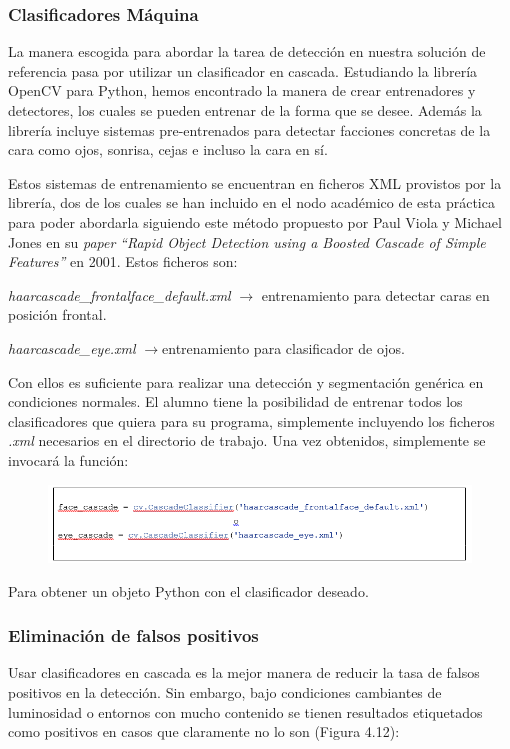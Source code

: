 \subsubsection{Clasificadores Máquina}
La manera escogida para abordar la tarea de detección en nuestra solución de referencia pasa por utilizar un clasificador en cascada. 
Estudiando la librería OpenCV para Python, hemos encontrado la manera de crear entrenadores y detectores, los cuales se pueden entrenar de la forma que se desee. Además la librería incluye sistemas pre-entrenados para detectar facciones concretas de la cara como ojos, sonrisa, cejas e incluso la cara en sí.

Estos sistemas de entrenamiento se encuentran en ficheros XML provistos por la librería, dos de los cuales se han incluido en el nodo académico de esta práctica para poder abordarla siguiendo este método propuesto por  Paul Viola y Michael Jones en su \textit{paper} \textit{``Rapid Object Detection using a Boosted Cascade of Simple Features''} en 2001. Estos ficheros son:

\textit{haarcascade\_frontalface\_default.xml} $\rightarrow$ entrenamiento para detectar caras en posición frontal.

\textit{haarcascade\_eye.xml} $\rightarrow$entrenamiento para clasificador de ojos.

Con ellos es suficiente para realizar una detección y segmentación genérica en condiciones normales. El alumno tiene la posibilidad de entrenar todos los clasificadores que quiera para su programa, simplemente incluyendo los ficheros \textit{.xml} necesarios en el directorio de trabajo. Una vez obtenidos, simplemente se invocará la función:

\begin{figure}[H]
  \begin{center}
    \includegraphics[width=0.99\linewidth]{figures/classifiercode.png}
		\label{fig.classifiercode}
		\end{center}
\end{figure}
Para obtener un objeto Python con el clasificador deseado.

\subsubsection{Eliminación de falsos positivos}
Usar clasificadores en cascada es la mejor manera de reducir la tasa de falsos positivos en la detección. Sin embargo, bajo condiciones cambiantes de luminosidad o entornos con mucho contenido se tienen resultados etiquetados como positivos en casos que claramente no lo son (Figura 4.12):

